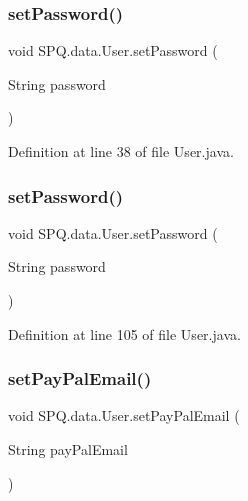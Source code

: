 \subsubsection{\texorpdfstring{set\+Password()}{setPassword()}\hspace{0.1cm}{\footnotesize\ttfamily [3/4]}}
{\footnotesize\ttfamily void S\+P\+Q.\+data.\+User.\+set\+Password (\begin{DoxyParamCaption}\item[{String}]{password }\end{DoxyParamCaption})}



Definition at line 38 of file User.\+java.

\mbox{\label{class_s_p_q_1_1data_1_1_user_aa5bcf362d3c9c4746f406239bcb041f5}} 
\subsubsection{\texorpdfstring{set\+Password()}{setPassword()}\hspace{0.1cm}{\footnotesize\ttfamily [4/4]}}
{\footnotesize\ttfamily void S\+P\+Q.\+data.\+User.\+set\+Password (\begin{DoxyParamCaption}\item[{String}]{password }\end{DoxyParamCaption})}



Definition at line 105 of file User.\+java.

\mbox{\label{class_s_p_q_1_1data_1_1_user_abe8156eec92d2d94d290b96af8e8ea94}} 
\subsubsection{\texorpdfstring{set\+Pay\+Pal\+Email()}{setPayPalEmail()}}
{\footnotesize\ttfamily void S\+P\+Q.\+data.\+User.\+set\+Pay\+Pal\+Email (\begin{DoxyParamCaption}\item[{String}]{pay\+Pal\+Email }\end{DoxyParamCaption})}



